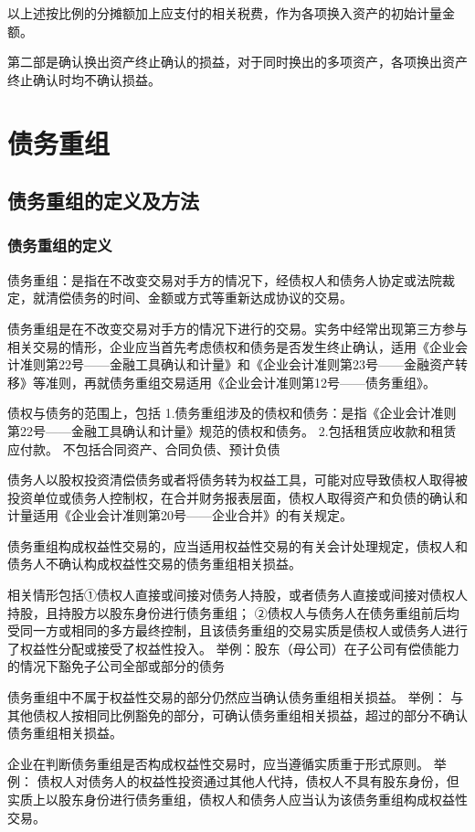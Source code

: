 \documentclass[UTF8,12pt]{ctexart}
\numberwithin{equation}{section} %
\numberwithin{figure}{section}
\numberwithin{table}{section}
\begin{document}
	以上述按比例的分摊额加上应支付的相关税费，作为各项换入资产的初始计量金额。
	
	第二部是确认换出资产终止确认的损益，对于同时换出的多项资产，各项换出资产终止确认时均不确认损益。
	
	\newpage
	\section{债务重组}
	\subsection{债务重组的定义及方法}
	\subsubsection{债务重组的定义}
	债务重组：是指在不改变交易对手方的情况下，经债权人和债务人协定或法院裁定，就清偿债务的时间、金额或方式等重新达成协议的交易。
	
	债务重组是在不改变交易对手方的情况下进行的交易。实务中经常出现第三方参与相关交易的情形，企业应当首先考虑债权和债务是否发生终止确认，适用《企业会计准则第22号——金融工具确认和计量》和《企业会计准则第23号——金融资产转移》等准则，再就债务重组交易适用《企业会计准则第12号——债务重组》。
	
	债权与债务的范围上，包括
	1.债务重组涉及的债权和债务：是指《企业会计准则第22号——金融工具确认和计量》规范的债权和债务。
	2.包括租赁应收款和租赁应付款。
	不包括合同资产、合同负债、预计负债
	
	债务人以股权投资清偿债务或者将债务转为权益工具，可能对应导致债权人取得被投资单位或债务人控制权，在合并财务报表层面，债权人取得资产和负债的确认和计量适用《企业会计准则第20号——企业合并》的有关规定。
	
	债务重组构成权益性交易的，应当适用权益性交易的有关会计处理规定，债权人和债务人不确认构成权益性交易的债务重组相关损益。
	
	相关情形包括①债权人直接或间接对债务人持股，或者债务人直接或间接对债权人持股，且持股方以股东身份进行债务重组；
	②债权人与债务人在债务重组前后均受同一方或相同的多方最终控制，且该债务重组的交易实质是债权人或债务人进行了权益性分配或接受了权益性投入。
	举例：股东（母公司）在子公司有偿债能力的情况下豁免子公司全部或部分的债务
	
	债务重组中不属于权益性交易的部分仍然应当确认债务重组相关损益。
	举例：
	与其他债权人按相同比例豁免的部分，可确认债务重组相关损益，超过的部分不确认债务重组相关损益。
	
	企业在判断债务重组是否构成权益性交易时，应当遵循实质重于形式原则。
	举例：
	债权人对债务人的权益性投资通过其他人代持，债权人不具有股东身份，但实质上以股东身份进行债务重组，债权人和债务人应当认为该债务重组构成权益性交易。
	
\end{document}
